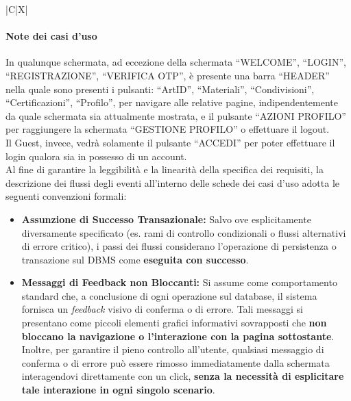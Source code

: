 \begin{tabularx}{\textwidth}{|C|X|}
{\begin{enumerate}
\begin{enumerate}
    \end{enumerate}
\end{enumerate}
}
\hline
\end{tabularx}

\clearpage

\paragraph{Note dei casi d'uso}
In qualunque schermata, ad eccezione della schermata ``WELCOME'', ``LOGIN'', ``REGISTRAZIONE'', ``VERIFICA OTP'', è presente una barra ``HEADER'' nella quale sono presenti i pulsanti: ``ArtID'', ``Materiali'', ``Condivisioni'', ``Certificazioni'', ``Profilo'', per navigare alle relative pagine, indipendentemente da quale schermata sia attualmente mostrata, e il pulsante ``AZIONI PROFILO'' per raggiungere la schermata ``GESTIONE PROFILO'' o effettuare il logout.\\
Il Guest, invece, vedrà solamente il pulsante ``ACCEDI'' per poter effettuare il login qualora sia in possesso di un account.\\

Al fine di garantire la leggibilit\`a e la linearit\`a della specifica dei requisiti, la descrizione dei flussi degli eventi all'interno delle schede dei casi d'uso adotta le seguenti convenzioni formali:
\begin{itemize}
    \item \textbf{Assunzione di Successo Transazionale:} Salvo ove esplicitamente diversamente specificato (es. rami di controllo condizionali o flussi alternativi di errore critico), i passi dei flussi considerano l'operazione di persistenza o transazione sul DBMS come \textbf{eseguita con successo}.
    \item \textbf{Messaggi di Feedback non Bloccanti:} Si assume come comportamento standard che, a conclusione di ogni operazione sul database, il sistema fornisca un \textit{feedback} visivo di conferma o di errore. Tali messaggi si presentano come piccoli elementi grafici informativi sovrapposti che \textbf{non bloccano la navigazione o l'interazione con la pagina sottostante}. Inoltre, per garantire il pieno controllo all'utente, qualsiasi messaggio di conferma o di errore pu\`o essere rimosso immediatamente dalla schermata interagendovi direttamente con un click, \textbf{senza la necessit\`a di esplicitare tale interazione in ogni singolo scenario}.
\end{itemize}



